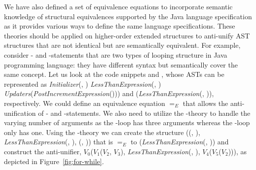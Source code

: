 We have also defined a set of equivalence equations to incorporate semantic knowledge of structural equivalences supported by the Java language specification as it provides various ways to define the same language specifications. These theories should be applied on higher-order extended structures to anti-unify AST structures that are not identical but are semantically equivalent. For example, consider - and -statements that are two types of looping structure in Java programming language: they have different syntax but semantically cover the same concept. Let us look at the code snippets  and , whose ASTs can be represented as \textit{Initializer}(, )\code{;} \textit{LessThanExpression}(, )\code{;} \textit{Updaters}(\textit{PostIncrementExpression}())) and (\textit{LessThanExpression}(, )), respectively. We could define an equivalence equation $=_E$ that allows the anti-unification of - and -statements. We also need to utilize the \NIL{}-theory to handle the varying number of arguments as the -loop has three arguments whereas the -loop only has one. Using the \NIL{}-theory we can create the structure (\NIL{}(\NIL{}, \NIL{}), \textit{LessThanExpression}(, ), \NIL{}(\NIL{}, \NIL{})) that is $=_E$ to (\textit{LessThanExpression}(, )) and construct the anti-unifier, $V_0$($V_1$($V_2$, $V_3$), \textit{LessThanExpression}(, ), $V_4$($V_5$($V_2$))), as depicted in Figure~\ref{fig:for-while}.

